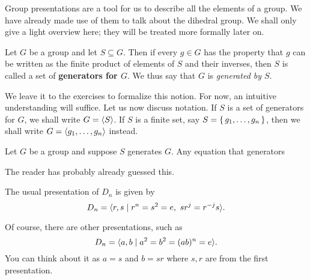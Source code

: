\documentclass[./main.tex]{subfiles}
\begin{document}
Group presentations are a tool for us to describe all the elements
of a group. We have already made use of them to talk about the dihedral group.
We shall only give a light overview here; they will be treated more formally
later on. 


\begin{definition}[Generator]
\label{def:generator}
    Let $G$ be a group and let $S \subseteq G$. Then if every $g \in G$ has the
    property that $g$ can be written as the finite product of elements of $S$
    and their inverses, then $S$ is called a set of \textbf{generators for $G$}.
    We thus say that $G$ is \emph{generated by $S$}.
\end{definition}
We leave it to the exercises to formalize this notion. For now, an intuitive
understanding will suffice. Let us now discuss notation. If $S$ is a set of
generators for $G$, we shall write $G = { \langle S \rangle }$. If $S$ is a finite set, say $S
= \set{g_1, \dots, g_n}$, then we shall write $G = { \langle g_1, \dots, g_n \rangle }$
instead.

\begin{definition}[Relation]
\label{def:relation}
    Let $G$ be a group and suppose $S$ generates $G$. Any equation that generators 
\end{definition}

\begin{example}[Presentation of $\bZ$]
    The reader has probably already guessed this. 
\end{example}

\begin{example}[Presentation of $D_n$]
\label{example:presentation-of-dihedral}
    The usual presentation of $D_n$ is given by 
    \[
        D_n = { \langle r, s \mid r^n = s^2 = e, \,\, sr^j = r^{-j}s \rangle }.
    \]

    Of course, there are other presentations, such as 
    \[
        D_n = { \langle a, b \mid a^2 = b^2 = (ab)^n = e \rangle }.
    \]
    You can think about it as $a=s$ and $b=sr$ where $s, r$ are from the first
    presentation.
\end{example}
\end{document}
